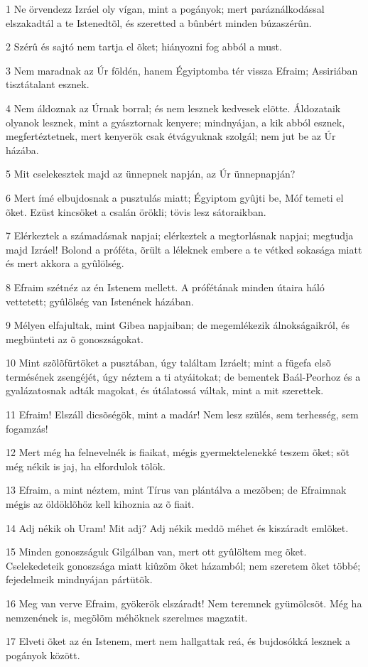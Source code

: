 \par 1 Ne örvendezz Izráel oly vígan, mint a pogányok; mert paráználkodással elszakadtál a te Istenedtõl, és szeretted a bûnbért minden búzaszérûn.
\par 2 Szérû és sajtó nem tartja el õket; hiányozni fog abból a must.
\par 3 Nem maradnak az Úr földén, hanem Égyiptomba tér vissza Efraim; Assiriában tisztátalant esznek.
\par 4 Nem áldoznak az Úrnak borral; és nem lesznek kedvesek elõtte. Áldozataik olyanok lesznek, mint a gyásztornak kenyere; mindnyájan, a kik abból esznek, megfertéztetnek, mert kenyerök csak étvágyuknak szolgál; nem jut be az Úr házába.
\par 5 Mit cselekesztek majd az ünnepnek napján, az Úr ünnepnapján?
\par 6 Mert ímé elbujdosnak a pusztulás miatt; Égyiptom gyûjti be, Móf temeti el õket. Ezüst kincsöket a csalán örökli; tövis lesz  sátoraikban.
\par 7 Elérkeztek a számadásnak napjai; elérkeztek a megtorlásnak napjai; megtudja majd Izráel! Bolond a próféta, õrült a léleknek embere a te vétked sokasága miatt és mert akkora a gyûlölség.
\par 8 Efraim szétnéz az én Istenem mellett. A prófétának minden útaira háló vettetett; gyûlölség van Istenének házában.
\par 9 Mélyen elfajultak, mint Gibea napjaiban; de megemlékezik álnokságaikról, és megbünteti az õ gonoszságokat.
\par 10 Mint szõlõfürtöket a pusztában, úgy találtam Izráelt; mint a fügefa elsõ termésének zsengéjét, úgy néztem a ti atyáitokat; de bementek Baál-Peorhoz  és a gyalázatosnak adták magokat, és útálatossá váltak, mint a mit szerettek.
\par 11 Efraim! Elszáll dicsõségök, mint a madár! Nem lesz szülés, sem terhesség, sem fogamzás!
\par 12 Mert még ha felnevelnék is fiaikat, mégis gyermektelenekké teszem õket; sõt még nékik is jaj, ha elfordulok tõlök.
\par 13 Efraim, a mint néztem, mint Tírus van plántálva a mezõben; de Efraimnak mégis az öldöklõhöz kell kihoznia az õ fiait.
\par 14 Adj nékik oh Uram! Mit adj? Adj nékik meddõ méhet és kiszáradt emlõket.
\par 15 Minden gonoszságuk Gilgálban van, mert ott gyûlöltem meg õket. Cselekedeteik gonoszsága miatt kiûzöm õket házamból;  nem szeretem õket többé; fejedelmeik mindnyájan pártütõk.
\par 16 Meg van verve Efraim, gyökerök elszáradt! Nem teremnek gyümölcsöt. Még ha nemzenének is, megölöm méhöknek szerelmes magzatit.
\par 17 Elveti õket az én Istenem, mert nem hallgattak reá, és bujdosókká lesznek a pogányok között.

